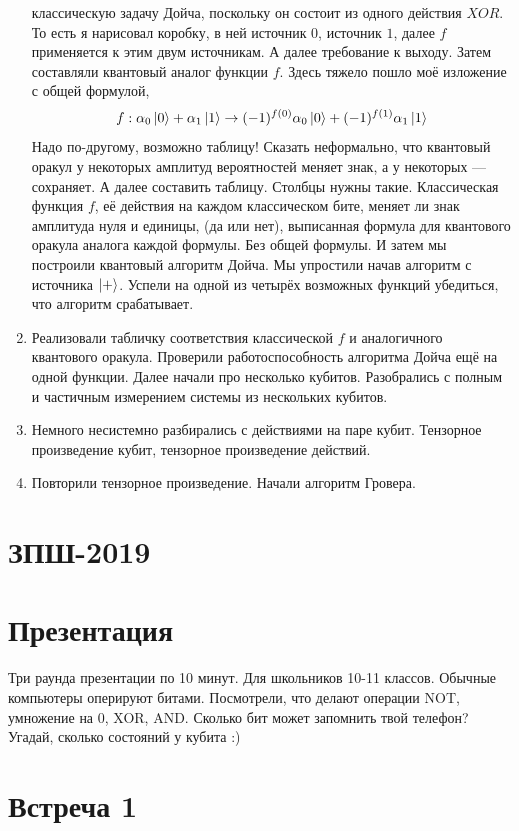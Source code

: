 \documentclass[12pt]{article}
\theoremstyle{definition}
\begin{document}
\begin{enumerate}
  классическую задачу Дойча, поскольку он состоит из одного действия $XOR$. То есть
  я нарисовал коробку, в ней источник $0$, источник $1$, далее $f$ применяется к
  этим двум источникам. А далее требование к выходу. Затем составляли квантовый
  аналог функции $f$. Здесь тяжело пошло моё изложение с общей формулой,
  \[
   f : \alpha_0 \ket{0} + \alpha_1 \ket{1} \to
   (-1)^{f(0)}\alpha_0 \ket{0} + (-1)^{f(1)}\alpha_1 \ket{1}
  \]
  Надо по-другому, возможно таблицу! Сказать неформально, что квантовый оракул
  у некоторых амплитуд вероятностей меняет знак, а у некоторых — сохраняет.
  А далее составить таблицу. Столбцы нужны такие. Классическая функция $f$,
  её действия на каждом классическом бите, меняет ли знак амплитуда нуля и единицы,
  (да или нет), выписанная формула для квантового оракула аналога каждой формулы.
  Без общей формулы. И затем мы построили
  квантовый алгоритм Дойча. Мы упростили начав алгоритм с источника $\ket{+}$.
  Успели на одной из четырёх возможных функций убедиться, что алгоритм срабатывает.
  \item Реализовали табличку соответствия классической $f$ и
  аналогичного квантового оракула. Проверили работоспособность алгоритма Дойча
  ещё на одной функции. Далее начали про несколько кубитов. Разобрались с полным
  и частичным измерением системы из нескольких кубитов.
  \item Немного несистемно разбирались с действиями на паре кубит. Тензорное произведение
  кубит, тензорное произведение действий.
  \item Повторили тензорное произведение. Начали алгоритм Гровера.
\end{enumerate}


\section{ЗПШ-2019}

\section{Презентация}

Три раунда презентации по 10 минут. Для школьников 10-11 классов. Обычные компьютеры
оперируют битами. Посмотрели, что делают операции NOT, умножение на 0, XOR, AND.
Сколько бит может запомнить твой телефон? Угадай, сколько состояний у кубита :)

\section{Встреча 1}
\end{document}
